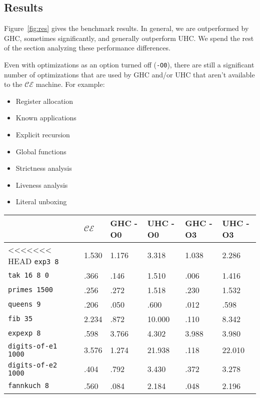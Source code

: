 \subsection{Results} \label{sec:res}

Figure~\ref{fig:res} gives the benchmark results.  In general, we are
outperformed by GHC, sometimes significantly, and generally outperform UHC. We
spend the rest of the section analyzing these performance differences.

Even with optimizations as an option turned off (\texttt{-O0}), there are still
a significant number of optimizations that are used by GHC and/or UHC that
aren't available to the $\mathcal{CE}$ machine. For example:

\begin{itemize}
\item Register allocation
\item Known applications
\item Explicit recursion
\item Global functions
\item Strictness analysis
\item Liveness analysis
\item Literal unboxing
\end{itemize}

\begin{figure*}
\centering
\begin{tabular}{l | l | l | l | l | l}
& $\mathcal{CE}$ & GHC -O0 & UHC -O0 & GHC -O3 & UHC -O3 \\
\hline
<<<<<<< HEAD
\texttt{exp3 8} & 1.530 & 1.176 & 3.318 & 1.038 & 2.286 \\
\texttt{tak 16 8 0} & .366 & .146 & 1.510 & .006 & 1.416 \\
\texttt{primes 1500} & .256 & .272 & 1.518 & .230 & 1.532 \\
\texttt{queens 9} & .206 & .050 & .600 & .012 & .598 \\
\texttt{fib 35} & 2.234 & .872 & 10.000 & .110 & 8.342 \\
\texttt{expexp 8} & .598 & 3.766 & 4.302 & 3.988 & 3.980 \\
\texttt{digits-of-e1 1000} & 3.576 & 1.274 & 21.938 & .118 & 22.010 \\
\texttt{digits-of-e2 1000} & .404 & .792 & 3.430 & .372 & 3.278 \\
\texttt{fannkuch 8} & .560 & .084 & 2.184 & .048 & 2.196 \\
\end{tabular}
\caption{Benchmark Results. Measurement is wall clock time, all units are
seconds. Times averaged over 5 runs}
\label{fig:res}
\end{figure*}

